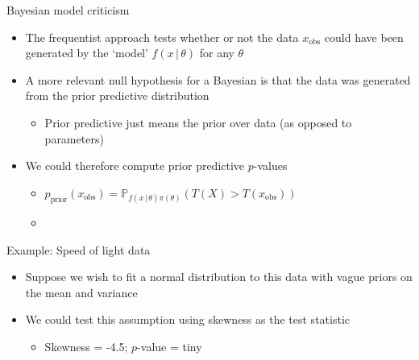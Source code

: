 \begin{frame}{Bayesian model criticism}
  \begin{itemize}
    \item The frequentist approach tests whether or not the data $x_{\textrm{obs}}$ could have been generated by the `model' $f(x\,|\,\theta)$ for any $\theta$
    \vspace{\baselineskip}
    \pause
    \item A more relevant null hypothesis for a Bayesian is that the data was generated from the prior predictive distribution
    \begin{itemize}
      \item Prior predictive just means the prior over data (as opposed to parameters)
    \end{itemize}
    \vspace{\baselineskip}
    \pause
    \item We could therefore compute prior predictive $p$-values
    \begin{itemize}
      \item $p_{\textrm{prior}}(x_{\textrm{obs}}) = \mathbb{P}_{f(x\,|\,\theta)\pi(\theta)}(T(X) > T(x_{\textrm{obs}}))$
      \item \cite{Box1980-ud}
    \end{itemize}
  \end{itemize}
\end{frame}

\begin{frame}{Example: Speed of light data}
  \begin{center}
  \end{center}
  \begin{itemize}
    \pause
    \item Suppose we wish to fit a normal distribution to this data with vague priors on the mean and variance
    \vspace{\baselineskip}
    \pause
    \item We could test this assumption using skewness as the test statistic
    \pause
    \begin{itemize}
      \item Skewness = -4.5; $p$-value = tiny
    \end{itemize}
  \end{itemize}
\end{frame}

